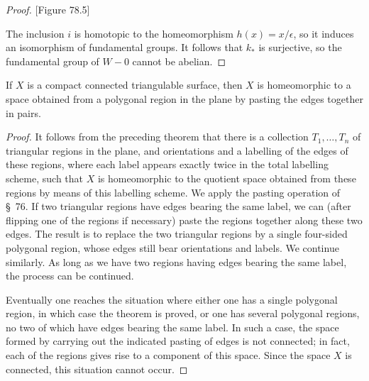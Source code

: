 \begin{proof}
[Figure 78.5]
\par\nopagebreak
\begin{center}
	\label{fig:com_78_55}
\end{center}
\par\nopagebreak 

The inclusion \(i\) is homotopic to the homeomorphism \(h(x) = x/\epsilon\), so it induces an isomorphism of fundamental groups. It follows that \(k_{ * }\) is surjective, so the fundamental group of \(W - 0\) cannot be abelian.
\end{proof}
\begin{theorem}
\label{thm:\thetheorem}
	If \(X\) is a compact connected triangulable surface, then \(X\) is homeomorphic to a space obtained from a polygonal region in the plane by pasting the edges together in pairs.
\end{theorem}

\begin{proof}
	It follows from the preceding theorem that there is a collection \(T_{1},\ldots ,T_{n}\) of triangular regions in the plane, and orientations and a labelling of the edges of these regions, where each label appears exactly twice in the total labelling scheme, such that \(X\) is homeomorphic to the quotient space obtained from these regions by means of this labelling scheme.
We apply the pasting operation of \S\ 76. If two triangular regions have edges bearing the same label, we can (after flipping one of the regions if necessary) paste the regions together along these two edges. The result is to replace the two triangular regions by a single four-sided polygonal region, whose edges still bear orientations and labels. We continue similarly. As long as we have two regions having edges bearing the same label, the process can be continued.

Eventually one reaches the situation where either one has a single polygonal region, in which case the theorem is proved, or one has several polygonal regions, no two of which have edges bearing the same label. In such a case, the space formed by carrying out the indicated pasting of edges is not connected; in fact, each of the regions gives rise to a component of this space. Since the space \(X\) is connected, this situation cannot occur.
\end{proof}
